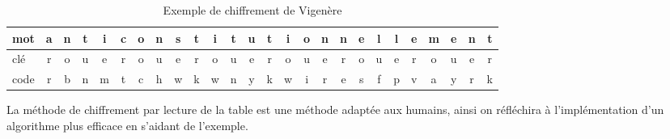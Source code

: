\begin{table}[htbp]
	\centering
		\begin{tabular}{l|*{25}{|c}}
			mot & a & n & t & i & c & o & n & s & t & i & t & u & t & i & o & n & n & e & l & l & e & m & e & n & t \\
			\hline
			clé & r & o & u & e & r & o & u & e & r & o & u & e & r & o & u & e & r & o & u & e & r & o & u & e & r \\
			\hline
			code & r & b & n & m & t & c & h & w & k & w & n & y & k & w & i & r & e & s & f & p & v & a & y & r & k \\
			\hline
		\end{tabular}
		\caption{Exemple de chiffrement de Vigenère}
		\label{TabVig}
\end{table}


La méthode de chiffrement par lecture de la table est une méthode adaptée \og aux humains\fg, ainsi on réfléchira à l'implémentation d'un algorithme plus efficace en s'aidant de l'exemple.




\vspace{0.5cm}

